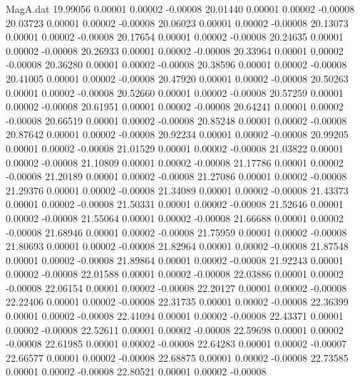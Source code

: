 \begin{filecontents}{MagA.dat}
  19.99056    0.00001    0.00002   -0.00008
  20.01440    0.00001    0.00002   -0.00008
  20.03723    0.00001    0.00002   -0.00008
  20.06023    0.00001    0.00002   -0.00008
  20.13073    0.00001    0.00002   -0.00008
  20.17654    0.00001    0.00002   -0.00008
  20.24635    0.00001    0.00002   -0.00008
  20.26933    0.00001    0.00002   -0.00008
  20.33964    0.00001    0.00002   -0.00008
  20.36280    0.00001    0.00002   -0.00008
  20.38596    0.00001    0.00002   -0.00008
  20.41005    0.00001    0.00002   -0.00008
  20.47920    0.00001    0.00002   -0.00008
  20.50263    0.00001    0.00002   -0.00008
  20.52660    0.00001    0.00002   -0.00008
  20.57259    0.00001    0.00002   -0.00008
  20.61951    0.00001    0.00002   -0.00008
  20.64241    0.00001    0.00002   -0.00008
  20.66519    0.00001    0.00002   -0.00008
  20.85248    0.00001    0.00002   -0.00008
  20.87642    0.00001    0.00002   -0.00008
  20.92234    0.00001    0.00002   -0.00008
  20.99205    0.00001    0.00002   -0.00008
  21.01529    0.00001    0.00002   -0.00008
  21.03822    0.00001    0.00002   -0.00008
  21.10809    0.00001    0.00002   -0.00008
  21.17786    0.00001    0.00002   -0.00008
  21.20189    0.00001    0.00002   -0.00008
  21.27086    0.00001    0.00002   -0.00008
  21.29376    0.00001    0.00002   -0.00008
  21.34089    0.00001    0.00002   -0.00008
  21.43373    0.00001    0.00002   -0.00008
  21.50331    0.00001    0.00002   -0.00008
  21.52646    0.00001    0.00002   -0.00008
  21.55064    0.00001    0.00002   -0.00008
  21.66688    0.00001    0.00002   -0.00008
  21.68946    0.00001    0.00002   -0.00008
  21.75959    0.00001    0.00002   -0.00008
  21.80693    0.00001    0.00002   -0.00008
  21.82964    0.00001    0.00002   -0.00008
  21.87548    0.00001    0.00002   -0.00008
  21.89864    0.00001    0.00002   -0.00008
  21.92243    0.00001    0.00002   -0.00008
  22.01588    0.00001    0.00002   -0.00008
  22.03886    0.00001    0.00002   -0.00008
  22.06154    0.00001    0.00002   -0.00008
  22.20127    0.00001    0.00002   -0.00008
  22.22406    0.00001    0.00002   -0.00008
  22.31735    0.00001    0.00002   -0.00008
  22.36399    0.00001    0.00002   -0.00008
  22.41094    0.00001    0.00002   -0.00008
  22.43371    0.00001    0.00002   -0.00008
  22.52611    0.00001    0.00002   -0.00008
  22.59698    0.00001    0.00002   -0.00008
  22.61985    0.00001    0.00002   -0.00008
  22.64283    0.00001    0.00002   -0.00007
  22.66577    0.00001    0.00002   -0.00008
  22.68875    0.00001    0.00002   -0.00008
  22.73585    0.00001    0.00002   -0.00008
  22.80521    0.00001    0.00002   -0.00008

\end{filecontents}
